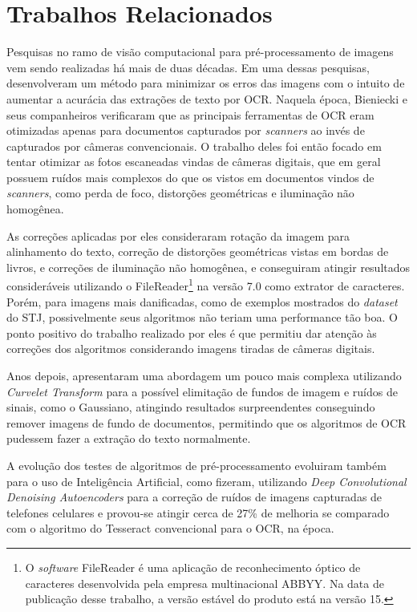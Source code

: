 \section{Trabalhos Relacionados}

Pesquisas no ramo de visão computacional para pré-processamento de imagens vem sendo realizadas há mais de duas décadas. Em uma dessas pesquisas,  desenvolveram um método para minimizar os erros das imagens com o intuito de aumentar a acurácia das extrações de texto por OCR. Naquela época, Bieniecki e seus companheiros verificaram que as principais ferramentas de OCR eram otimizadas apenas para documentos capturados por \textit{scanners} ao invés de capturados por câmeras convencionais. O trabalho deles foi então focado em tentar otimizar as fotos escaneadas vindas de câmeras digitais, que em geral possuem ruídos mais complexos do que os vistos em documentos vindos de \textit{scanners}, como perda de foco, distorções geométricas e iluminação não homogênea.

As correções aplicadas por eles consideraram rotação da imagem para alinhamento do texto, correção de distorções geométricas vistas em bordas de livros, e correções de iluminação não homogênea, e conseguiram atingir resultados consideráveis utilizando o FileReader\footnote{O \textit{software} FileReader é uma aplicação de reconhecimento óptico de caracteres desenvolvida pela empresa multinacional ABBYY. Na data de publicação desse trabalho, a versão estável do produto está na versão 15.} na versão 7.0 como extrator de caracteres. Porém, para imagens mais danificadas, como de exemplos mostrados do \textit{dataset} do STJ, possivelmente seus algoritmos não teriam uma performance tão boa. O ponto positivo do trabalho realizado por eles é que permitiu dar atenção às correções dos algoritmos considerando imagens tiradas de câmeras digitais.

Anos depois,  apresentaram uma abordagem um pouco mais complexa utilizando \textit{Curvelet Transform} \cite{curvelet-transform} para a possível elimitação de fundos de imagem e ruídos de sinais, como o Gaussiano, atingindo resultados surpreendentes  conseguindo remover imagens de fundo de documentos, permitindo que os algoritmos de OCR pudessem fazer a extração do texto normalmente.

A evolução dos testes de algoritmos de pré-processamento evoluiram também para o uso de Inteligência Artificial, como  fizeram,  utilizando \textit{Deep Convolutional Denoising Autoencoders} para a correção de ruídos de imagens capturadas de telefones celulares e provou-se atingir cerca de 27\% de melhoria se comparado com o algoritmo do Tesseract convencional para o OCR, na época.


